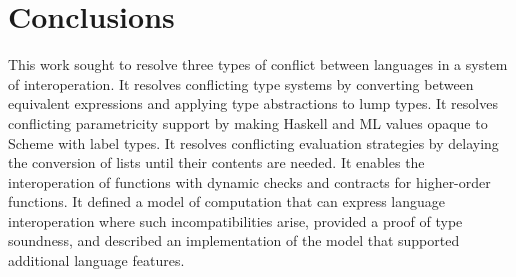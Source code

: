 \chapter{Conclusions}

This work sought to resolve three types of conflict between languages in a system of interoperation.  It resolves conflicting type systems by converting between equivalent expressions and applying type abstractions to lump types.  It resolves conflicting parametricity support by making Haskell and ML values opaque to Scheme with label types.  It resolves conflicting evaluation strategies by delaying the conversion of lists until their contents are needed.  It enables the interoperation of functions with dynamic checks and contracts for higher-order functions.  It defined a model of computation that can express language interoperation where such incompatibilities arise, provided a proof of type soundness, and described an implementation of the model that supported additional language features.